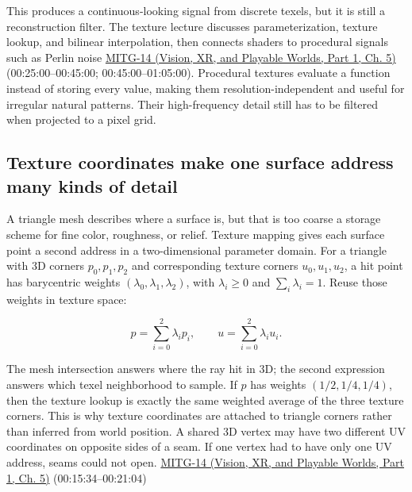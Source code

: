 This produces a continuous-looking signal from discrete texels, but it is still a reconstruction filter. The texture lecture discusses parameterization, texture lookup, and bilinear interpolation, then connects shaders to procedural signals such as Perlin noise \href{../07-Vision-XR-and-Playable-Worlds-P01/main.pdf\#04-visual-computing-ii-ch036-mitg-14---texture-mapping}{MITG-14 (Vision, XR, and Playable Worlds, Part 1, Ch. 5)} (00:25:00--00:45:00; 00:45:00--01:05:00). Procedural textures evaluate a function instead of storing every value, making them resolution-independent and useful for irregular natural patterns. Their high-frequency detail still has to be filtered when projected to a pixel grid.

\subsection{Texture coordinates make one surface address many kinds of detail}\label{03-visual-computing-i-ch019-texture-coordinates-make-one-surface-address-many-kinds-of-detail}

\hypertarget{03-visual-computing-i-ch019-texture-coordinates-make-one-surface-address-many-kinds-of-detail}{}

A triangle mesh describes where a surface is, but that is too coarse a storage scheme for fine color, roughness, or relief. Texture mapping gives each surface point a second address in a two-dimensional parameter domain. For a triangle with 3D corners \(p_0,p_1,p_2\) and corresponding texture corners \(u_0,u_1,u_2\), a hit point has barycentric weights \((\lambda_0,\lambda_1,\lambda_2)\), with \(\lambda_i\ge 0\) and \(\sum_i\lambda_i=1\). Reuse those weights in texture space:

\[
p=\sum_{i=0}^2\lambda_i p_i,\qquad u=\sum_{i=0}^2\lambda_i u_i.
\]

The mesh intersection answers where the ray hit in 3D; the second expression answers which texel neighborhood to sample. If \(p\) has weights \((1/2,1/4,1/4)\), then the texture lookup is exactly the same weighted average of the three texture corners. This is why texture coordinates are attached to triangle corners rather than inferred from world position. A shared 3D vertex may have two different UV coordinates on opposite sides of a seam. If one vertex had to have only one UV address, seams could not open. \href{../07-Vision-XR-and-Playable-Worlds-P01/main.pdf\#04-visual-computing-ii-ch036-mitg-14---texture-mapping}{MITG-14 (Vision, XR, and Playable Worlds, Part 1, Ch. 5)} (00:15:34--00:21:04)

